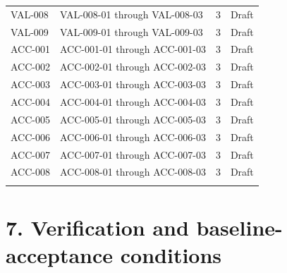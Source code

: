 \documentclass[11pt,letterpaper]{article}
\begin{document}
\begin{small}
\begin{longtable}{@{}L{0.14\textwidth}L{0.56\textwidth}L{0.12\textwidth}L{0.10\textwidth}@{}}
\addlinespace[2pt]
VAL-008 & VAL-008-01 through VAL-008-03 & 3 & Draft \\
\addlinespace[2pt]
VAL-009 & VAL-009-01 through VAL-009-03 & 3 & Draft \\
\addlinespace[2pt]
ACC-001 & ACC-001-01 through ACC-001-03 & 3 & Draft \\
\addlinespace[2pt]
ACC-002 & ACC-002-01 through ACC-002-03 & 3 & Draft \\
\addlinespace[2pt]
ACC-003 & ACC-003-01 through ACC-003-03 & 3 & Draft \\
\addlinespace[2pt]
ACC-004 & ACC-004-01 through ACC-004-03 & 3 & Draft \\
\addlinespace[2pt]
ACC-005 & ACC-005-01 through ACC-005-03 & 3 & Draft \\
\addlinespace[2pt]
ACC-006 & ACC-006-01 through ACC-006-03 & 3 & Draft \\
\addlinespace[2pt]
ACC-007 & ACC-007-01 through ACC-007-03 & 3 & Draft \\
\addlinespace[2pt]
ACC-008 & ACC-008-01 through ACC-008-03 & 3 & Draft \\
\addlinespace[2pt]
\end{longtable}
\end{small}

\section{7. Verification and baseline-acceptance conditions}
\end{document}
